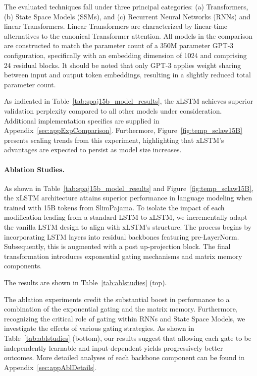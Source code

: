 The evaluated techniques fall under three principal categories: (a) Transformers, (b) State Space Models (SSMs), and (c) Recurrent Neural Networks (RNNs) and linear Transformers. Linear Transformers are characterized by linear-time alternatives to the canonical Transformer attention. All models in the comparison are constructed to match the parameter count of a 350M parameter GPT-3 configuration, specifically with an embedding dimension of 1024 and comprising 24 residual blocks. It should be noted that only GPT-3 applies weight sharing between input and output token embeddings, resulting in a slightly reduced total parameter count.

As indicated in Table~\ref{tab:spaj15b_model_results}, the xLSTM achieves superior validation perplexity compared to all other models under consideration. Additional implementation specifics are supplied in Appendix~\ref{sec:appExpComparison}. Furthermore, Figure~\ref{fig:temp_sclaw15B} presents scaling trends from this experiment, highlighting that xLSTM's advantages are expected to persist as model size increases.

\paragraph{Ablation Studies.}
As shown in Table~\ref{tab:spaj15b_model_results} and Figure~\ref{fig:temp_sclaw15B}, the xLSTM architecture attains superior performance in language modeling when trained with 15B tokens from SlimPajama. To isolate the impact of each modification leading from a standard LSTM to xLSTM, we incrementally adapt the vanilla LSTM design to align with xLSTM's structure. The process begins by incorporating LSTM layers into residual backbones featuring pre-LayerNorm. Subsequently, this is augmented with a post up-projection block. The final transformation introduces exponential gating mechanisms and matrix memory components.

The results are shown in Table~\ref{tab:ablstudies} (top). 

The ablation experiments credit the substantial boost in performance to a combination of the exponential gating and the matrix memory. Furthermore, recognizing the critical role of gating within RNNs and State Space Models, we investigate the effects of various gating strategies. As shown in Table~\ref{tab:ablstudies} (bottom), our results suggest that allowing each gate to be independently learnable and input-dependent yields progressively better outcomes. More detailed analyses of each backbone component can be found in Appendix~\ref{sec:appAblDetails}.

